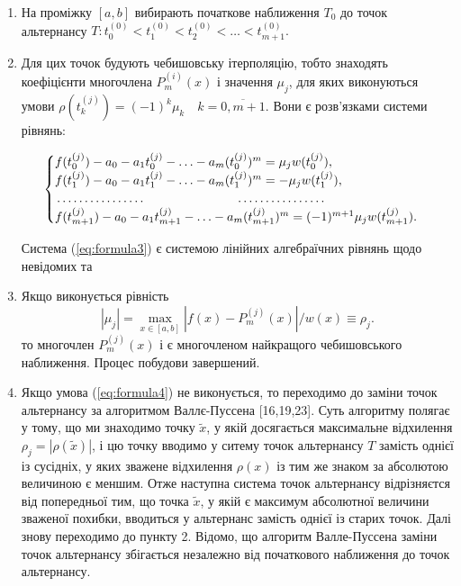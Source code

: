 \documentclass[ukrainian,14pt]{extarticle}
\begin{document}
\begin{enumerate}

\item
    На проміжку $[a, b]$ вибирають початкове наближення $T_0$ до точок альтернансу $T: t^{(0)}_{0} < t^{(0)}_{1} < t^{(0)}_{2} < \ldots < t^{(0)}_{m+1}.$
\item
    Для цих точок будують чебишовську ітерполяцію, тобто знаходять коефіцієнти многочлена $P^{(i)}_m(x)$ і значення $\mu_j$, для яких виконуються умови  $\rho(t^{(j)}_k) = (-1)^{k} \mu_k \quad k = \overline{0, m+1}$. Вони є розв'язками системи рівнянь:

\begin{equation}\label{eq:formula3}
\begin{cases}
f(t^{(j)}_0) - a_0 - a_1t^{(j)}_0 - \ldots - a_m(t_0^{(j)})^m=\mu_jw(t_0^{(j)}), \\
f(t^{(j)}_1)-a_0-a_1t^{(j)}_1 - \ldots - a_m(t^{(j)}_1)^m = - \mu_jw(t^{(j)}_1),\\
\dotfill\hfill\hbox{} \dotfill\hfill\hbox{}\\
f(t^{(j)}_{m+1}) -a_0 -a_1t^{(j)}_{m+1} - \ldots - a_m(t^{(j)}_{m+1})^m = (-1)^{m+1}\mu_jw(t^{(j)}_{m+1}).
\end{cases}
\end{equation}

Система (\ref{eq:formula3}) є системою   лінійних алгебраїчних рівнянь щодо невідомих   та  

\item
    Якщо виконується рівність
    \begin{equation}\label{eq:formula4}
        |\mu_j| = \max_{x \in [a,b]} |f(x) - P^{(j)}_m(x)| / w(x) \equiv \rho_j.
        \end{equation}
    то многочлен  $P^{(j)}_m(x)$ і є многочленом найкращого чебишовського наближення. Процес побудови завершений.
\item
    Якщо умова (\ref{eq:formula4}) не виконується, то переходимо до заміни точок альтернансу за алгоритмом Валлє-Пуссена [16,19,23]. Суть алгоритму полягає у тому, що ми знаходимо точку $\tilde{x}$, у якій досягається максимальне відхилення $\rho_j = |\rho(\tilde{x})|$, і цю точку   вводимо у ситему точок альтернансу $T$ замість однієї із сусідніх, у яких зважене відхилення $\rho(x)$ із тим же знаком за абсолютою величиною є меншим. Отже наступна система точок альтернансу відрізняєтся від попередньої тим, що точка $\tilde{x}$, у якій є максимум абсолютної величини зваженої похибки, вводиться у альтернанс замість однієї із старих точок. Далі знову переходимо до пункту 2. Відомо, що алгоритм Валле-Пуссена заміни точок альтернансу збігається незалежно від початкового наближення до точок альтернансу. 

\end{enumerate}
\end{document}
